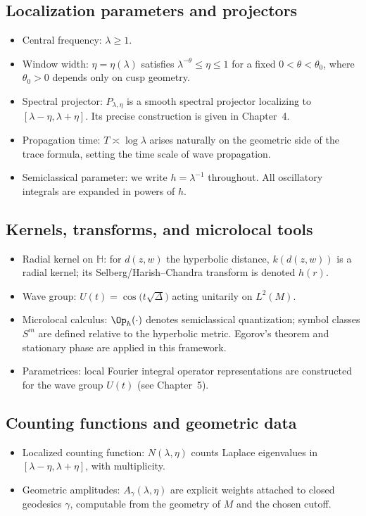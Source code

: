 \subsection*{Localization parameters and projectors}
\begin{itemize}
  \item Central frequency: $\lambda\ge 1$.
  \item Window width: $\eta=\eta(\lambda)$ satisfies 
    $\lambda^{-\theta}\le \eta\le 1$ for a fixed $0<\theta<\theta_0$, 
    where $\theta_0>0$ depends only on cusp geometry.
  \item Spectral projector: $P_{\lambda,\eta}$ is a smooth spectral projector 
    localizing to $[\lambda-\eta,\lambda+\eta]$. 
    Its precise construction is given in Chapter~4.
  \item Propagation time: $T\asymp \log \lambda$ arises naturally on the geometric side 
    of the trace formula, setting the time scale of wave propagation.
  \item Semiclassical parameter: we write $h=\lambda^{-1}$ throughout. 
    All oscillatory integrals are expanded in powers of $h$.
\end{itemize}

\subsection*{Kernels, transforms, and microlocal tools}
\begin{itemize}
  \item Radial kernel on $\mathbb{H}$: 
    for $d(z,w)$ the hyperbolic distance, 
    $k(d(z,w))$ is a radial kernel; 
    its Selberg/Harish--Chandra transform is denoted $h(r)$.
  \item Wave group: $U(t)=\cos\!\big(t\sqrt{\Delta}\big)$ acting unitarily on $L^2(M)$.
  \item Microlocal calculus: $\Op_h(\cdot)$ denotes semiclassical quantization; 
    symbol classes $S^m$ are defined relative to the hyperbolic metric. 
    Egorov’s theorem and stationary phase are applied in this framework.
  \item Parametrices: local Fourier integral operator representations 
    are constructed for the wave group $U(t)$ (see Chapter~5).
\end{itemize}

\subsection*{Counting functions and geometric data}
\begin{itemize}
  \item Localized counting function: $N(\lambda,\eta)$ counts Laplace eigenvalues 
    in $[\lambda-\eta,\lambda+\eta]$, with multiplicity.
  \item Geometric amplitudes: $A_\gamma(\lambda,\eta)$ are explicit weights 
    attached to closed geodesics $\gamma$, 
    computable from the geometry of $M$ and the chosen cutoff.
\end{itemize}

